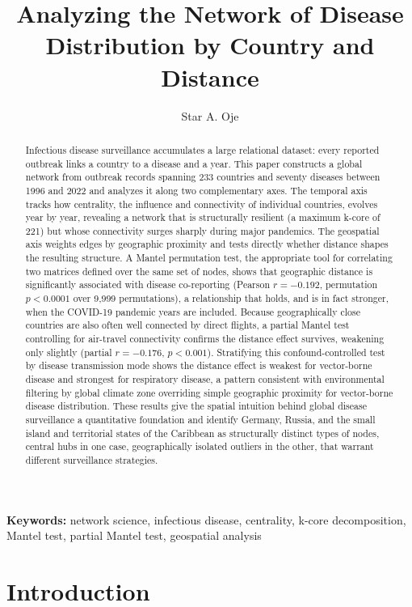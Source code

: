 \documentclass[11pt]{article}
\title{\large\bfseries Analyzing the Network of Disease Distribution by Country and Distance}
\author{Star A. Oje}
\affil{Department of Mathematics and Statistics, Washington State University}
\date{}
\begin{document}
\maketitle

\begin{abstract}
Infectious disease surveillance accumulates a large relational dataset: every reported
outbreak links a country to a disease and a year. This paper constructs a global network
from outbreak records spanning 233 countries and seventy diseases between 1996 and 2022 and
analyzes it along two complementary axes. The temporal axis tracks how centrality, the
influence and connectivity of individual countries, evolves year by year, revealing a
network that is structurally resilient (a maximum k-core of 221) but whose connectivity
surges sharply during major pandemics. The geospatial axis weights edges by geographic
proximity and tests directly whether distance shapes the resulting structure. A Mantel
permutation test, the appropriate tool for correlating two matrices defined over the same
set of nodes, shows that geographic distance is significantly associated with disease
co-reporting (Pearson $r=-0.192$, permutation $p<0.0001$ over 9{,}999 permutations), a
relationship that holds, and is in fact stronger, when the COVID-19 pandemic years are
included. Because geographically close countries are also often well connected by direct
flights, a partial Mantel test controlling for air-travel connectivity confirms the distance
effect survives, weakening only slightly (partial $r=-0.176$, $p<0.001$). Stratifying this
confound-controlled test by disease transmission mode shows the distance effect is weakest
for vector-borne disease and strongest for respiratory disease, a pattern consistent with
environmental filtering by global climate zone overriding simple geographic proximity for
vector-borne disease distribution. These results give the spatial intuition behind global
disease surveillance a quantitative foundation and identify Germany, Russia, and the small
island and territorial states of the Caribbean as structurally distinct types of nodes,
central hubs in one case, geographically isolated outliers in the other, that warrant
different surveillance strategies.
\end{abstract}

\noindent\textbf{Keywords:} network science, infectious disease, centrality, k-core
decomposition, Mantel test, partial Mantel test, geospatial analysis

\section{Introduction}
\end{document}
